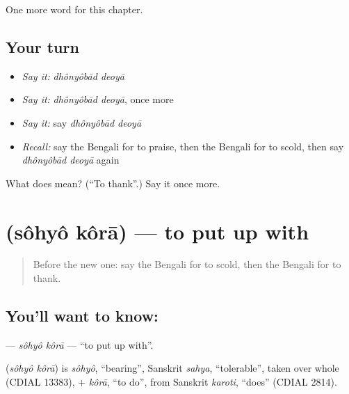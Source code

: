 \begin{grammarlens}[title={What you've built}]
One more word for this chapter.
\end{grammarlens}

\subsection*{Your turn}
\begin{itemize}
\raggedright
  \item \emph{Say it:} \emph{dhônyôbād deoyā}
  \item \emph{Say it:} \emph{dhônyôbād deoyā}, once more
  \item \emph{Say it:} say \emph{dhônyôbād deoyā}
  \item \emph{Recall:} say the Bengali for to praise, then the Bengali for to scold, then say \emph{dhônyôbād deoyā} again
\end{itemize}

\begin{tcolorbox}[breakable,colback=teal!4,colframe=teal!35!black,title={Before you move on}]
What does   mean? (\textquotedblleft{}To thank\textquotedblright{}.) Say it once more.
\end{tcolorbox}
\section[\texorpdfstring{\bn{সহ্য} \bn{করা} (sôhyô kôrā)}{সহ্য করা (sôhyô kôrā)}]{  (sôhyô kôrā) — to put up with}

\label{lesson:BN-C153-sohyo-kora}



\begin{quote}
Before the new one: say the Bengali for to scold, then the Bengali for to thank.
\end{quote}

\subsection*{You'll want to know:  }
\textbf{ } — \emph{sôhyô kôrā} — \textquotedblleft{}to put up with\textquotedblright{}.

\begin{cousinweb}
\textbf{ } (\emph{sôhyô kôrā}) is \emph{sôhyô}, \textquotedblleft{}bearing\textquotedblright{}, Sanskrit \emph{sahya}, \textquotedblleft{}tolerable\textquotedblright{}, taken over whole (CDIAL 13383), + \emph{kôrā}, \textquotedblleft{}to do\textquotedblright{}, from Sanskrit \emph{karoti}, \textquotedblleft{}does\textquotedblright{} (CDIAL 2814).
\end{cousinweb}

